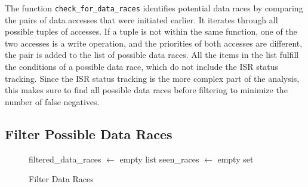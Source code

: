 \documentclass[
fancyheadings, %
%
%
]{stsreprt}
\begin{document}
{The function \texttt{check\_for\_data\_races} identifies potential data races by comparing the pairs of data accesses that were initiated earlier. It iterates through all possible tuples of accesses. If a tuple is not within the same function, one of the two accesses is a write operation, and the priorities of both accesses are different, the pair is added to the list of possible data races. All the items in the list fulfill the conditions of a possible data race, which do not include the \ac{ISR} status tracking. Since the \ac{ISR} status tracking is the more complex part of the analysis, this makes sure to find all possible data races before filtering to minimize the number of false negatives.



\subsection*{Filter Possible Data Races}

\begin{figure}[H]
	\centering
\begin{algorithm}[H]
	\caption{Filter Data Races}
	\DontPrintSemicolon
	\SetAlgoLined
	\BlankLine
	
	filtered\_data\_races $\gets$ empty list\;
	seen\_races $\gets$ empty set\;
	
	

\end{algorithm}
\end{figure}}
\end{document}

